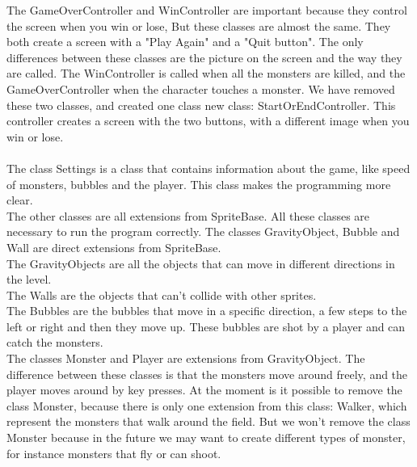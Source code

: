 The GameOverController and WinController are important because they control the screen when you win or lose, But these classes are almost the same. They both create a screen with a "Play Again" and a "Quit button". The only differences between these classes are the picture on the screen and the way they are called. The WinController is called when all the monsters are killed, and the GameOverController when the character touches a monster. We have removed these two classes, and created one class new class: StartOrEndController. This controller creates a screen with the two buttons, with a different image when you win or lose.\\
\\
The class Settings is a class that contains information about the game, like speed of monsters, bubbles and the player. This class makes the programming more clear.
\\
The other classes are all extensions from SpriteBase. All these classes are necessary to run the program correctly. The classes GravityObject, Bubble and Wall are direct extensions from SpriteBase.\\
The GravityObjects are all the objects that can move in different directions in the level.\\
The Walls are the objects that can't collide with other sprites.\\
The Bubbles are the bubbles that move in a specific direction, a few steps to the left or right and then they move up. These bubbles are shot by a player and can catch the monsters.\\
The classes Monster and Player are extensions from GravityObject. The difference between these classes is that the monsters move around freely, and the player moves around by key presses. At the moment is it possible to remove the class Monster, because there is only one extension from this class: Walker, which represent the monsters that walk around the field. But we won't remove the class Monster because in the future we may want to create different types of monster, for instance monsters that fly or can shoot.